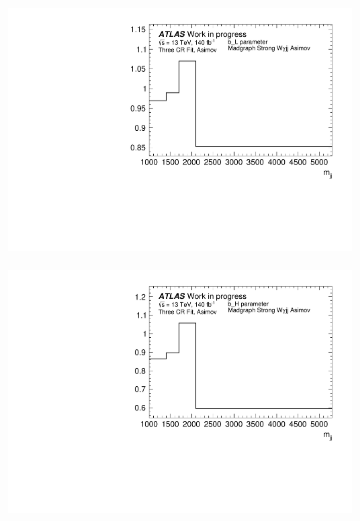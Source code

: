 \begin{figure}[t]
\begin{subfigure}[b]{0.48\textwidth}
    \centering
    \includegraphics[width=\textwidth]{plots/diffx/mgasimovtest/b_LWyC_constant_fx_mjj.pdf}
    \caption{}
\end{subfigure}
\hfill
\begin{subfigure}[b]{0.48\textwidth}
    \centering
    \includegraphics[width=\textwidth]{plots/diffx/mgasimovtest/b_HWyC_constant_fx_mjj.pdf}
    \caption{}
\end{subfigure}
\begin{subfigure}[b]{0.48\textwidth}
    \centering

\end{subfigure}
\end{figure}
